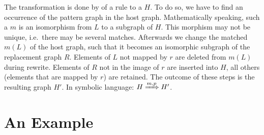 The transformation is done by  of a rule to a  $H$.
To do so, we have to find an occurrence of the pattern graph in the host graph. 
Mathematically speaking, such a  $m$ is an isomorphism from $L$ to a subgraph of $H$.
This morphism may not be unique, i.e.\ there may be several matches.
Afterwards we change the matched  $m(L)$ of the host graph, such that it becomes an isomorphic subgraph of the replacement graph $R$.
Elements of $L$ not mapped by $r$ are deleted from $m(L)$ during rewrite.
Elements of $R$ not in the image of $r$ are inserted into $H$, all others (elements that are mapped by $r$) are retained.
The outcome of these steps is the resulting graph $H'$. In symbolic language: $H \xRightarrow{m, p} H'$.


\section{An Example}
\label{ov:example}

